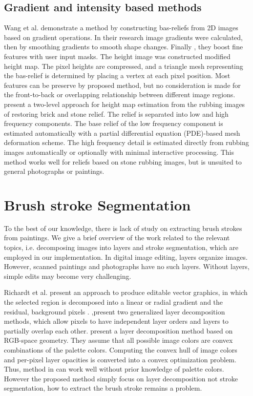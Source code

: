 \subsection{Gradient and intensity based methods}
Wang et al.\cite{wang2010image} demonstrate a method by constructing bas-reliefs from 2D images based on gradient operations. In their research image gradients were calculated, then by smoothing gradients to smooth shape changes. Finally , they boost fine features with user input masks.
The height image was constructed modified height map. The pixel heights are compressed, and a triangle mesh representing the bas-relief is determined by placing a vertex at each pixel position. Most features can be preserve by proposed method, but no consideration is made for the front-to-back or overlapping relationship between different image regions. \newline
\cite{li2012restoration} present a two-level approach for height map estimation from the rubbing images of restoring brick and stone relief.  The relief is separated into low and high frequency components. The base relief of the low frequency component is estimated automatically with a partial differential equation (PDE)-based mesh deformation scheme. The high frequency detail is estimated directly from rubbing images automatically or optionally with minimal interactive processing. This method works well for reliefs based on stone rubbing images, but is unsuited to general photographs or paintings.

\section{Brush stroke Segmentation}

To the best of our knowledge, there is lack of study on extracting brush strokes from paintings. We give a brief overview of the work related to the relevant topics, i.e. decomposing images into layers and stroke segmentation, which are employed in our implementation. In digital image editing, layers organize images. However, scanned paintings and photographs have no such layers. Without layers, simple edits may become very challenging.

Richardt et al.\cite{richardt2014vectorising} present an approach to produce editable vector graphics, in which the selected region is decomposed into a linear or radial gradient and the residual, background pixels . \cite{mccann2009local},\cite{mccann2012soft}present two generalized layer decomposition methods, which allow pixels to have independent layer orders and layers to partially overlap each other.\cite{tan2016decomposing} present a layer decomposition method based on RGB-space geometry. They assume that all possible image colors are convex combinations of the palette colors. Computing the convex hull of image colors and per-pixel layer opacities is converted into a convex optimization problem. Thus, method in \cite{tan2016decomposing} can work well without prior knowledge of palette colors. However the proposed method simply focus on layer decomposition not stroke segmentation, how to extract the brush stroke remains a problem. 

